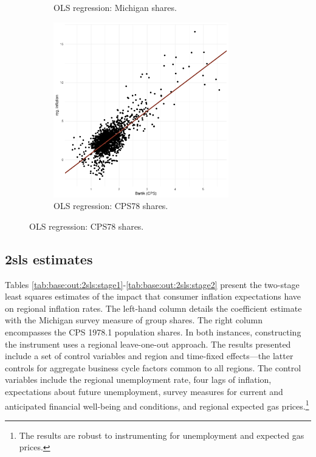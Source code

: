 \documentclass[12pt]{article}
\begin{document}
\begin{figure}
\begin{subfigure}[t]{0.475\textwidth}
%
\caption{OLS regression: Michigan shares.}\label{subfig:redform:stage2:michigan}
\end{subfigure}
\begin{subfigure}[t]{0.475\textwidth}
\centering
\includegraphics[width =3in, height =3in]{figs/redform_cps}
%
\caption{OLS regression: CPS78 shares.}\label{subfig:redform:stage2:cps}
\end{subfigure}
\end{figure}


\subsection{2sls estimates}\label{mainEstimates}



Tables \ref{tab:base:out:2sls:stage1}-\ref{tab:base:out:2sls:stage2} present the two-stage least squares estimates of the impact that consumer inflation expectations have on regional inflation rates. The left-hand column details the coefficient estimate with the Michigan survey measure of group shares. The right column encompasses the CPS 1978.1 population shares. In both instances, constructing the instrument uses a regional leave-one-out approach. The results presented include a set of control variables and region and time-fixed effects—the latter controls for aggregate business cycle factors common to all regions. The control variables include the regional unemployment rate, four lags of inflation, expectations about future unemployment, survey measures for current and anticipated financial well-being and conditions, and regional expected gas prices.\footnote{The results are robust to instrumenting for unemployment and expected gas prices.}



\end{document}
